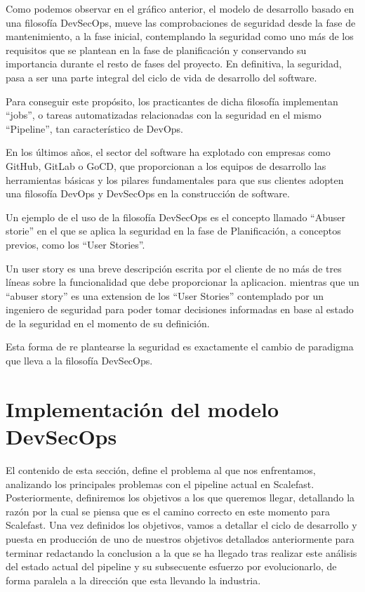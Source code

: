 \documentclass[12pt]{report} %
\begin{document}
Como podemos observar en el gráfico anterior, el modelo de desarrollo basado en una filosofía DevSecOps, mueve las comprobaciones de seguridad desde la fase de mantenimiento, a la fase inicial, contemplando la seguridad como uno más de los requisitos que se plantean en la fase de planificación y conservando su importancia durante el resto de fases del proyecto.
En definitiva, la seguridad, pasa a ser una parte integral del ciclo de vida de desarrollo del software. 

Para conseguir este propósito, los practicantes de dicha filosofía implementan ``jobs'', o tareas automatizadas relacionadas con la seguridad en el mismo ``Pipeline'', tan característico de DevOps.

En los últimos años, el sector del software ha explotado con empresas como GitHub, GitLab o GoCD, que proporcionan a los equipos de desarrollo las herramientas básicas y los pilares fundamentales para que sus clientes adopten una filosofía DevOps y DevSecOps en la construcción de software.\cite{Google2019}

Un ejemplo de el uso de la filosofía DevSecOps es el concepto llamado ``Abuser storie'' \cite{Bor2006} en el que se aplica la seguridad en la fase de Planificación, a conceptos previos, como los ``User Stories''.

Un user story es una breve descripción escrita por el cliente de no más de tres líneas sobre la funcionalidad que debe proporcionar la aplicacion.  \cite{XPUserStory} mientras que un ``abuser story'' es una extension de los ``User Stories'' contemplado por un ingeniero de seguridad para poder tomar decisiones informadas en base al estado de la seguridad en el momento de su definición. \cite{Bor2006}

Esta forma de re plantearse la seguridad es exactamente el cambio de paradigma que lleva a la filosofía DevSecOps.


\chapter{Implementación del modelo DevSecOps}

El contenido de esta sección, define el problema al que nos enfrentamos, analizando los principales problemas con el pipeline actual en Scalefast.
Posteriormente, definiremos los objetivos a los que queremos llegar, detallando la razón por la cual se piensa que es el camino correcto en este momento para Scalefast.
Una vez definidos los objetivos, vamos a detallar el ciclo de desarrollo y puesta en producción de uno de nuestros objetivos detallados anteriormente para terminar redactando la conclusion a la que se ha llegado tras realizar este análisis del estado actual del pipeline y su subsecuente esfuerzo por evolucionarlo, de forma paralela a la dirección que esta llevando la industria.
\end{document}
